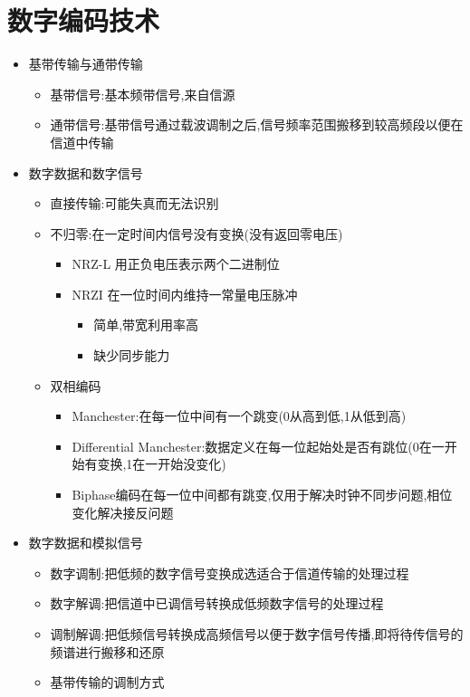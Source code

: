 \documentclass[a4paper,12pt,notitlepage]{article}
\begin{document}
\section{数字编码技术}
\begin{itemize}
	\item 基带传输与通带传输
	\begin{itemize}
		\item 基带信号:基本频带信号,来自信源
		\item 通带信号:基带信号通过载波调制之后,信号频率范围搬移到较高频段以便在信道中传输
	\end{itemize}
	\item 数字数据和数字信号
	\begin{itemize}
		\item 直接传输:可能失真而无法识别
		\item 不归零:在一定时间内信号没有变换(没有返回零电压)
		\begin{itemize}
			\item NRZ-L 用正负电压表示两个二进制位
			\item NRZI 在一位时间内维持一常量电压脉冲
			\begin{itemize}
				\item 简单,带宽利用率高
				\item 缺少同步能力
			\end{itemize}
		\end{itemize}
		\item 双相编码
		\begin{itemize}
			\item Manchester:在每一位中间有一个跳变(0从高到低,1从低到高)
			\item Differential Manchester:数据定义在每一位起始处是否有跳位(0在一开始有变换,1在一开始没变化)
			\item Biphase编码在每一位中间都有跳变,仅用于解决时钟不同步问题,相位变化解决接反问题
		\end{itemize}
	\end{itemize}
	\item 数字数据和模拟信号
	\begin{itemize}
		\item 数字调制:把低频的数字信号变换成选适合于信道传输的处理过程
		\item 数字解调:把信道中已调信号转换成低频数字信号的处理过程
		\item 调制解调:把低频信号转换成高频信号以便于数字信号传播,即将待传信号的频谱进行搬移和还原
		\item 基带传输的调制方式
		\begin{itemize}

\end{itemize}
\end{itemize}
\end{itemize}
\end{document}
